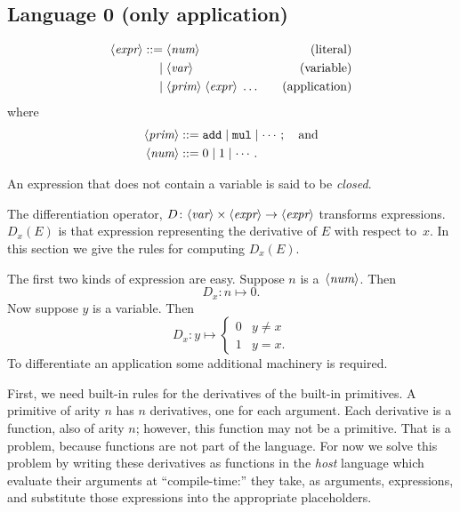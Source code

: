 \documentclass[11pt, a4paper]{article}
\begin{document}
\subsection{Language 0 (only application)}

\begin{equation*}
  \begin{aligned}
    \langle\textit{expr}\rangle  ::= {} & \langle\textit{num}\rangle &&& \text{(literal)} \\
             \mid {} & \langle\textit{var}\rangle  &&& \text{(variable)} \\
             \mid {} & \langle\textit{prim}\rangle \; \langle\textit{expr}\rangle \; \dotsc  &&& \text{(application)}
  \end{aligned}
\end{equation*}
where
\begin{equation*}
  \begin{aligned}
    \langle\textit{prim}\rangle ::= {}& \texttt{add} \mid \texttt{mul} \mid \dotsb; \quad\text{and} \\
    \langle\textit{num}\rangle ::= {}& 0 \mid 1 \mid \dotsb.
  \end{aligned}
\end{equation*}

An expression that does not contain a variable is said to be
\emph{closed}.

The differentiation operator, $D\colon \langle\textit{var}\rangle\times\langle\textit{expr}\rangle \to \langle\textit{expr}\rangle$ transforms
expressions. $D_x(E)$ is that expression representing the derivative
of $E$ with respect to~$x$. In this section we give the rules for
computing $D_x(E)$.

The first two kinds of expression are easy. Suppose $n$ is
a~$\langle\textit{num}\rangle$. Then
\begin{equation*}
  D_x \colon n \mapsto 0.
\end{equation*}
Now suppose $y$ is a variable. Then
\begin{equation*}
  D_x \colon y \mapsto
  \begin{cases}
    0 & y \neq x \\
    1 & y = x.
  \end{cases}
\end{equation*}
To differentiate an application some additional machinery is required.

First, we need built-in rules for the derivatives of the built-in
primitives. A primitive of arity $n$ has $n$ derivatives, one for each
argument. Each derivative is a function, also of arity $n$; however,
this function may not be a primitive. That is a problem, because
functions are not part of the language. For now we solve this problem
by writing these derivatives as functions in the \emph{host} language
which evaluate their arguments at ``compile-time:'' they take, as
arguments, expressions, and substitute those expressions into the
appropriate placeholders.
\end{document}
